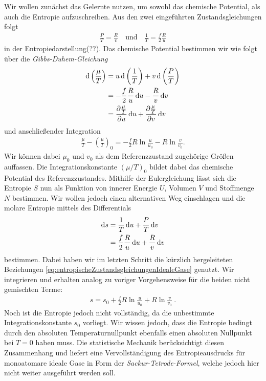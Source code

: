 Wir wollen zunächst das Gelernte nutzen, um sowohl das chemische Potential, als auch die Entropie aufzuschreiben. Aus den zwei eingeführten Zustandsgleichungen folgt 
\begin{align}
    \label{eq:entropischeZustandsgleichungenIdealeGase}
    \boxed{\frac{P}{T}=\frac{R}{v} \quad\text{und}\quad \frac{1}{T}=\frac{f}{2}\frac{R}{u}}
\end{align} 
in der Entropiedarstellung(??).
Das chemische Potential bestimmen wir wie folgt über die \emph{Gibbs-Duhem-Gleichung} 
\begin{align*}
    \mathop{}\!\mathrm{d} \left(\frac{\mu}{T}\right)&=u\mathop{}\!\mathrm{d}\left(\frac{1}{T}\right)+v\mathop{}\!\mathrm{d} \left(\frac{P}{T}\right)\\
    &=-\frac{f}{2}\frac{R}{u}\mathop{}\!\mathrm{d} u-\frac{R}{v}\mathop{}\!\mathrm{d} v\\
    &=\frac{\partial \frac{\mu}{T}}{\partial u}\mathop{}\!\mathrm{d} u+\frac{\partial \frac{\mu}{T}}{\partial v}\mathop{}\!\mathrm{d} v
\end{align*}  
und anschließender Integration 
\begin{align*}
    \frac{\mu}{T}-\left(\frac{\mu}{T}\right)_0=-\frac{f}{2}R\ln\frac{u}{u_0}-R\ln\frac{v}{v_0}.
\end{align*}
Wir können dabei $\mu_0$ und $v_0$ als dem Referenzzustand zugehörige Größen auffassen.
Die Integrationskonstante $(\mu/T)_0$ bildet dabei das chemische Potential des Referenzzustandes.
Mithilfe der Eulergleichung lässt sich die Entropie $S$ nun als Funktion von innerer Energie $U$, Volumen $V$ und Stoffmenge $N$ bestimmen. Wir wollen jedoch einen alternativen Weg einschlagen und die molare Entropie mittels des Differentials 
\begin{align*}
    \mathop{}\!\mathrm{d} s&=\frac{1}{T}\mathop{}\!\mathrm{d} u+\frac{P}{T}\mathop{}\!\mathrm{d} v\\
    &=\frac{f}{2}\frac{R}{u}\mathop{}\!\mathrm{d} u+\frac{R}{v}\mathop{}\!\mathrm{d} v    
\end{align*} 
bestimmen.
Dabei haben wir im letzten Schritt die kürzlich hergeleiteten Beziehungen \eqref{eq:entropischeZustandsgleichungenIdealeGase} genutzt.
Wir integrieren und erhalten analog zu voriger Vorgehensweise für die beiden nicht gemischten Terme: 
\begin{align}
    \label{eq:EntropieEinkomponentigesIdealesGas}
    \boxed{s=s_0+\frac{f}{2}R\ln\frac{u}{u_0}+R\ln\frac{v}{v_0}}\:.
\end{align}
Noch ist die Entropie jedoch nicht vollständig, da die unbestimmte Integrationskonstante $s_0$ vorliegt. Wir wissen jedoch, dass die Entropie \textendash{} bedingt durch den absoluten Temperaturnullpunkt \textendash{} ebenfalls einen absoluten Nullpunkt bei $T=0$ haben muss. 
Die statistische Mechanik berücksichtigt diesen Zusammenhang und liefert eine Vervollständigung des Entropieausdrucks für monoatomare ideale Gase in Form der \emph{Sackur-Tetrode-Formel}, welche jedoch hier nicht weiter ausgeführt werden soll.

